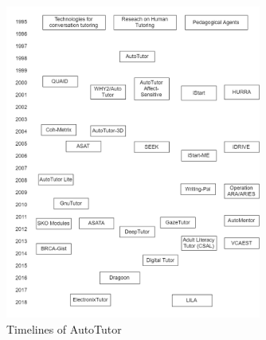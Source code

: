 \documentclass[letterpaper%
, twoside%
, 12pt%
,these%
, english%
,creativecommons,hyperref, withAlgo2e %
]{thETS}
\begin{document}
\begin{introduction}
\begin{figure}
	\includegraphics[width=0.75\textwidth]{Figures/1.png}
	
	\caption{Timelines of AutoTutor }
	\label{fig:timeline}
\end{figure}


\end{introduction}
\end{document}
